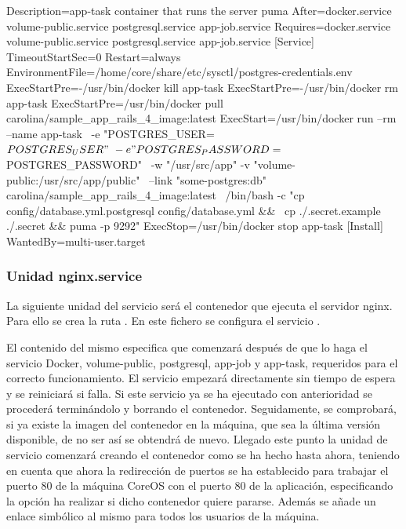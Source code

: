 \begin{codelisting}
\label{code:app-task.service}
\begin{code}
[Unit] 
  Description=app-task container that runs the server puma
  After=docker.service volume-public.service postgresql.service app-job.service
  Requires=docker.service volume-public.service postgresql.service app-job.service
[Service] 
  TimeoutStartSec=0
  Restart=always 
  EnvironmentFile=/home/core/share/etc/sysctl/postgres-credentials.env
  ExecStartPre=-/usr/bin/docker kill app-task 
  ExecStartPre=-/usr/bin/docker rm app-task
  ExecStartPre=/usr/bin/docker pull carolina/sample_app_rails_4_image:latest 
  ExecStart=/usr/bin/docker run --rm --name app-task \
  -e "POSTGRES_USER=${POSTGRES_USER}" \
  -e "POSTGRES_PASSWORD=${POSTGRES_PASSWORD}" \
  -w "/usr/src/app" -v "volume-public:/usr/src/app/public" \
  --link "some-postgres:db" carolina/sample_app_rails_4_image:latest \
  /bin/bash -c "cp config/database.yml.postgresql config/database.yml && \
  cp ./.secret.example ./.secret && puma -p 9292"
  ExecStop=/usr/bin/docker stop app-task
[Install] 
  WantedBy=multi-user.target
\end{code}
\end{codelisting}

\subsubsection{Unidad nginx.service}

La siguiente unidad del servicio será el contenedor que ejecuta el servidor nginx. Para ello se crea la ruta . En este fichero se configura el servicio .

El contenido del mismo especifica que comenzará después de que lo haga el servicio Docker, volume-public, postgresql, app-job y app-task, requeridos para el correcto funcionamiento. El servicio empezará directamente sin tiempo de espera y se reiniciará si falla. Si este servicio ya se ha ejecutado con anterioridad se procederá terminándolo y borrando el contenedor. Seguidamente, se comprobará, si ya existe la imagen del contenedor en la máquina, que sea la última versión disponible, de no ser así se obtendrá de nuevo. Llegado este punto la unidad de servicio comenzará creando el contenedor como se ha hecho hasta ahora, teniendo en cuenta que ahora la redirección de puertos se ha establecido para trabajar el puerto 80 de la máquina CoreOS con el puerto 80 de la aplicación, especificando la opción ha realizar si dicho contenedor quiere pararse. Además se añade un enlace simbólico al mismo para todos los usuarios de la máquina. 

